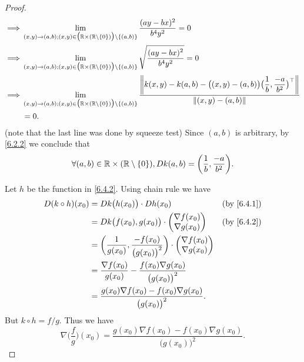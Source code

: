 \begin{proof}
\begin{align*}
    \implies & \lim_{(x, y) \to (a, b) ; (x, y) \in \big(\R \times (\R \setminus \{0\})\big) \setminus \{(a, b)\}} \dfrac{(ay - bx)^2}{b^4 y^2} = 0                                                                                                    \\
    \implies & \lim_{(x, y) \to (a, b) ; (x, y) \in \big(\R \times (\R \setminus \{0\})\big) \setminus \{(a, b)\}} \sqrt{\dfrac{(ay - bx)^2}{b^4 y^2}} = 0                                                                                             \\
    \implies & \lim_{(x, y) \to (a, b) ; (x, y) \in \big(\R \times (\R \setminus \{0\})\big) \setminus \{(a, b)\}} \dfrac{\norm*{k(x, y) - k(a, b) - \big((x, y) - (a, b)\big) \big(\dfrac{1}{b}, \dfrac{-a}{b^2}\big)^\top}}{\norm*{(x, y) - (a, b)}} \\
             & = 0.
  \end{align*}
  (note that the last line was done by squeeze test)
  Since \((a, b)\) is arbitrary, by \cref{6.2.2} we conclude that
  \[
    \forall (a, b) \in \R \times (\R \setminus \{0\}), D k(a, b) = \bigg(\dfrac{1}{b}, \dfrac{-a}{b^2}\bigg).
  \]

  Let \(h\) be the function in \cref{6.4.2}.
  Using chain rule we have
  \begin{align*}
    D (k \circ h)(x_0) & = D k\big(h(x_0)\big) \cdot D h(x_0)                                                       &  & \by{6.4.1} \\
                       & = D k\big(f(x_0), g(x_0)\big) \cdot \begin{pmatrix}
                                                               \nabla f(x_0) \\
                                                               \nabla g(x_0)
                                                             \end{pmatrix}                                        &  & \by{6.4.2}   \\
                       & = \bigg(\dfrac{1}{g(x_0)}, \dfrac{-f(x_0)}{\big(g(x_0)\big)^2}\bigg) \cdot \begin{pmatrix}
                                                                                                      \nabla f(x_0) \\
                                                                                                      \nabla g(x_0)
                                                                                                    \end{pmatrix}                  \\
                       & = \dfrac{\nabla f(x_0)}{g(x_0)} - \dfrac{f(x_0) \nabla g(x_0)}{\big(g(x_0)\big)^2}                         \\
                       & = \dfrac{g(x_0) \nabla f(x_0) - f(x_0) \nabla g(x_0)}{\big(g(x_0)\big)^2}.
  \end{align*}
  But \(k \circ h = f / g\).
  Thus we have
  \[
    \nabla \bigg(\dfrac{f}{g}\bigg)(x_0) = \dfrac{g(x_0) \nabla f(x_0) - f(x_0) \nabla g(x_0)}{\big(g(x_0)\big)^2}.
  \]
\end{proof}

